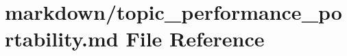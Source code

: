 \hypertarget{topic__performance__portability_8md}{}\section{markdown/topic\+\_\+performance\+\_\+portability.md File Reference}
\label{topic__performance__portability_8md}
